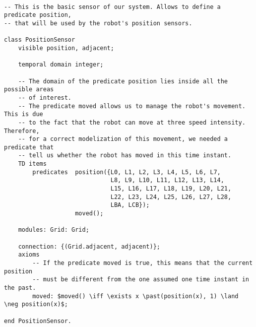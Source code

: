 \begin{lstlisting}[fontadjust, mathescape, frame=single]

-- This is the basic sensor of our system. Allows to define a predicate position,
-- that will be used by the robot's position sensors.

class PositionSensor
    visible position, adjacent;

    temporal domain integer;
    
    -- The domain of the predicate position lies inside all the possible areas
    -- of interest. 
    -- The predicate moved allows us to manage the robot's movement. This is due
    -- to the fact that the robot can move at three speed intensity. Therefore, 
    -- for a correct modelization of this movement, we needed a predicate that 
    -- tell us whether the robot has moved in this time instant.
    TD items 
        predicates  position({L0, L1, L2, L3, L4, L5, L6, L7,
                              L8, L9, L10, L11, L12, L13, L14,
                              L15, L16, L17, L18, L19, L20, L21,
                              L22, L23, L24, L25, L26, L27, L28,
                              LBA, LCB});
                    moved();

    modules: Grid: Grid;

    connection: {(Grid.adjacent, adjacent)};
    axioms
        -- If the predicate moved is true, this means that the current position
        -- must be different from the one assumed one time instant in the past.
        moved: $moved() \iff \exists x \past(position(x), 1) \land \neg position(x)$;

end PositionSensor.
\end{lstlisting}